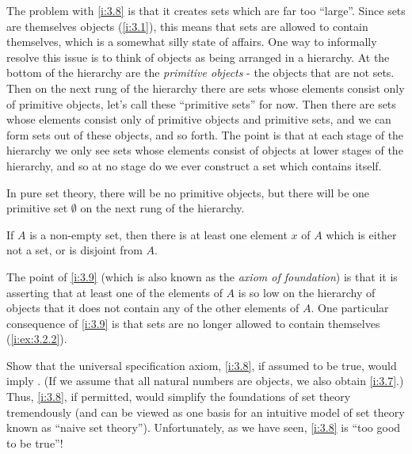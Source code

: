 \begin{note}
  The problem with \cref{i:3.8} is that it creates sets which are far too ``large''.
  Since sets are themselves objects (\cref{i:3.1}), this means that sets are allowed to contain themselves, which is a somewhat silly state of affairs.
  One way to informally resolve this issue is to think of objects as being arranged in a hierarchy.
  At the bottom of the hierarchy are the \emph{primitive objects} - the objects that are not sets.
  Then on the next rung of the hierarchy there are sets whose elements consist only of primitive objects, let's call these ``primitive sets'' for now.
  Then there are sets whose elements consist only of primitive objects and primitive sets, and we can form sets out of these objects, and so forth.
  The point is that at each stage of the hierarchy we only see sets whose elements consist of objects at lower stages of the hierarchy, and so at no stage do we ever construct a set which contains itself.
\end{note}

\begin{note}
  In pure set theory, there will be no primitive objects, but there will be one primitive set \(\emptyset\) on the next rung of the hierarchy.
\end{note}

\begin{ax}[Regularity]\label{i:3.9}
  If \(A\) is a non-empty set, then there is at least one element \(x\) of \(A\) which is either not a set, or is disjoint from \(A\).
\end{ax}

\begin{note}
  The point of \cref{i:3.9} (which is also known as the \emph{axiom of foundation}) is that it is asserting that at least one of the elements of \(A\) is so low on the hierarchy of objects that it does not contain any of the other elements of \(A\).
  One particular consequence of \cref{i:3.9} is that sets are no longer allowed to contain themselves (\cref{i:ex:3.2.2}).
\end{note}

\exercisesection

\begin{ex}\label{i:ex:3.2.1}
  Show that the universal specification axiom, \cref{i:3.8}, if assumed to be true, would imply .
  (If we assume that all natural numbers are objects, we also obtain \cref{i:3.7}.)
  Thus, \cref{i:3.8}, if permitted, would simplify the foundations of set theory tremendously (and can be viewed as one basis for an intuitive model of set theory known as ``naive set theory'').
  Unfortunately, as we have seen, \cref{i:3.8} is ``too good to be true''!
\end{ex}

